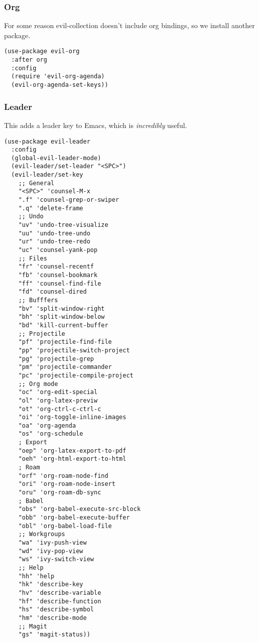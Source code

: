 \documentclass[11pt]{article}
\begin{document}
\subsubsection*{Org}
\label{sec:orgd859df0}

For some reason evil-collection doesn't include org bindings, so we install another package.

\begin{verbatim}
(use-package evil-org
  :after org
  :config
  (require 'evil-org-agenda)
  (evil-org-agenda-set-keys))
\end{verbatim}
\subsubsection*{Leader}
\label{sec:org6202755}

This adds a leader key to Emacs, which is \emph{incredibly} useful.

\begin{verbatim}
(use-package evil-leader
  :config
  (global-evil-leader-mode)
  (evil-leader/set-leader "<SPC>")
  (evil-leader/set-key
    ;; General
    "<SPC>" 'counsel-M-x
    ".f" 'counsel-grep-or-swiper
    ".q" 'delete-frame
    ;; Undo
    "uv" 'undo-tree-visualize
    "uu" 'undo-tree-undo
    "ur" 'undo-tree-redo
    "uc" 'counsel-yank-pop
    ;; Files
    "fr" 'counsel-recentf
    "fb" 'counsel-bookmark
    "ff" 'counsel-find-file
    "fd" 'counsel-dired
    ;; Bufffers
    "bv" 'split-window-right
    "bh" 'split-window-below
    "bd" 'kill-current-buffer
    ;; Projectile
    "pf" 'projectile-find-file
    "pp" 'projectile-switch-project
    "pg" 'projectile-grep
    "pm" 'projectile-commander
    "pc" 'projectile-compile-project
    ;; Org mode
    "oc" 'org-edit-special
    "ol" 'org-latex-previw
    "ot" 'org-ctrl-c-ctrl-c
    "oi" 'org-toggle-inline-images
    "oa" 'org-agenda
    "os" 'org-schedule
    ; Export
    "oep" 'org-latex-export-to-pdf
    "oeh" 'org-html-export-to-html
    ; Roam
    "orf" 'org-roam-node-find
    "ori" 'org-roam-node-insert
    "oru" 'org-roam-db-sync
    ; Babel
    "obs" 'org-babel-execute-src-block
    "obb" 'org-babel-execute-buffer
    "obl" 'org-babel-load-file
    ;; Workgroups
    "wa" 'ivy-push-view
    "wd" 'ivy-pop-view
    "ws" 'ivy-switch-view
    ;; Help
    "hh" 'help
    "hk" 'describe-key
    "hv" 'describe-variable
    "hf" 'describe-function
    "hs" 'describe-symbol
    "hm" 'describe-mode
    ;; Magit
    "gs" 'magit-status))
\end{verbatim}
\end{document}
